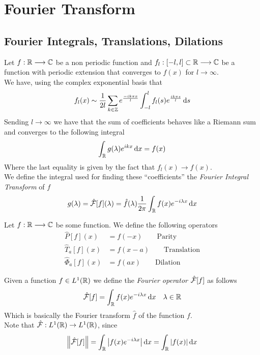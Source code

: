 \documentclass[../complete.tex]{subfiles}
\begin{document}
\section{Fourier Transform}
\subsection{Fourier Integrals, Translations, Dilations}
\begin{prop}
	Let $f:\mathbb{R}\overset{}{\longrightarrow}\mathbb{C}$ be a non periodic function and $f_l:[-l,l]\subset\mathbb{R}\overset{}{\longrightarrow}\mathbb{C}$ be a function with periodic extension that converges to $f(x)$ for $l\to\infty$.\\
	We have, using the complex exponential basis that
	\begin{equation*}
		f_l(x)\sim\frac{1}{2l}\sum_{k\in\mathbb{Z}}e^{\frac{-ik\pi x}{l}}\int_{-l}^{l}f_l(s)e^{\frac{ik\pi s}{l}}\operatorname{d\!} s
	\end{equation*}
	Sending $l\to\infty$ we have that the sum of coefficients behaves like a Riemann sum and converges to the following integral
	\begin{equation*}
		\int_{\mathbb{R}}^{}g(\lambda)e^{ikx}\operatorname{d\!} x=f(x)
	\end{equation*}
	Where the last equality is given by the fact that $f_l(x)\to f(x)$.\\
	We define the integral used for finding these ``coefficients'' the \textit{Fourier Integral Transform} of $f$
	\begin{equation*}
		g(\lambda)=\hat{\mathcal{F}}[f](\lambda)=\hat{f}(\lambda)\frac{1}{2\pi}\int_{\mathbb{R}}f(x)e^{-i\lambda x}\operatorname{d\!} x
	\end{equation*}
\end{prop}
\begin{dfn}
	Let $f:\mathbb{R}\overset{}{\longrightarrow}\mathbb{C}$ be some function. We define the following operators
	\begin{equation*}
		\begin{aligned}
			\hat{P}[f](x)&=f(-x)\qquad\text{Parity}\\
			\hat{T}_a[f](x)&=f(x-a)\qquad\text{Translation}\\
			\hat{\Phi}_a[f](x)&=f(ax)\qquad\text{Dilation}
		\end{aligned}
	\end{equation*}
\end{dfn}
\begin{dfn}
	Given a function $f\in L^1(\mathbb{R})$ we define the \textit{Fourier operator} $\hat{\mathcal{F}}[f]$ as follows
	\begin{equation*}
		\hat{\mathcal{F}}[f]=\int_{\mathbb{R}}^{}f(x)e^{-i\lambda x}\operatorname{d\!} x\quad\lambda\in\mathbb{R}
	\end{equation*}
	Which is basically the Fourier transform $\hat{f}$ of the function $f$.\\
	Note that $\hat{\mathcal{F}}:L^1(\mathbb{R})\to L^1(\mathbb{R})$, since
	\begin{equation*}
		\norm{\hat{\mathcal{F}}[f]}=\int_{\mathbb{R}}^{}\abs{f(x)e^{-i\lambda x}}\operatorname{d\!} x=\int_{\mathbb{R}}^{}\abs{f(x)}\operatorname{d\!} x
	\end{equation*}
\end{dfn}
\end{document}
